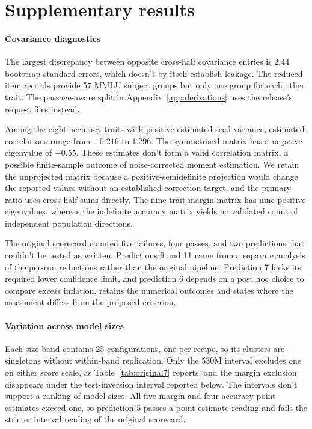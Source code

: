 \section{Supplementary results}
\label{app:supplementary}

\paragraph{Covariance diagnostics}
The largest discrepancy between opposite cross-half covariance entries is 2.44 bootstrap standard errors, which doesn't by itself establish leakage. The reduced item records provide 57 MMLU subject groups but only one group for each other trait. The passage-aware split in Appendix~\ref{app:derivations} uses the release's request files instead.

Among the eight accuracy traits with positive estimated seed variance, estimated correlations range from $-0.216$ to 1.296. The symmetrised matrix has a negative eigenvalue of $-0.55$. These estimates don't form a valid correlation matrix, a possible finite-sample outcome of noise-corrected moment estimation. We retain the unprojected matrix because a positive-semidefinite projection would change the reported values without an established correction target, and the primary ratio uses cross-half sums directly. The nine-trait margin matrix has nine positive eigenvalues, whereas the indefinite accuracy matrix yields no validated count of independent population directions.

The original scorecard counted five failures, four passes, and two predictions that couldn't be tested as written. Predictions 9 and 11 came from a separate analysis of the per-run reductions rather than the original pipeline. Prediction 7 lacks its required lower confidence limit, and prediction 6 depends on a post hoc choice to compare excess inflation.  retains the numerical outcomes and states where the assessment differs from the proposed criterion.
\paragraph{Variation across model sizes}
Each size band contains 25 configurations, one per recipe, so its clusters are singletons without within-band replication. Only the 530M interval excludes one on either score scale, as Table~\ref{tab:original7} reports, and the margin exclusion disappears under the test-inversion interval reported below. The intervals don't support a ranking of model sizes. All five margin and four accuracy point estimates exceed one, so prediction 5 passes a point-estimate reading and fails the stricter interval reading of the original scorecard.

